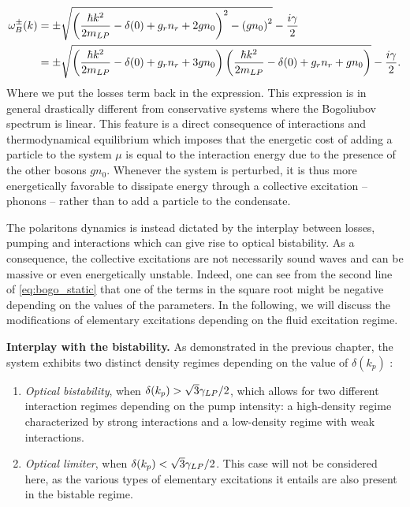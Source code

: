 \begin{equation}
    \begin{aligned}
    \omega^\pm_B(k)&= \pm\sqrt{\left(\dfrac{\hbar k^2}{2m_{LP}}-\delta(0)+ g_rn_r +2g n_0\right)^2 - \left(g n_0\right)^2}-\dfrac{i\gamma}{2} \\
                   &= \pm\sqrt{\left(\dfrac{\hbar k^2}{2m_{LP}}-\delta(0)+ g_rn_r +3g n_0\right)\left(\dfrac{\hbar k^2}{2m_{LP}}-\delta(0)+ g_rn_r +g n_0\right)}-\dfrac{i\gamma}{2}.
    \label{eq:bogo_static}
    \end{aligned}
\end{equation}
Where we put the losses term back in the expression. 
This expression is in general drastically different from conservative systems where the Bogoliubov spectrum is linear. This feature is a direct consequence of 
interactions and thermodynamical equilibrium which imposes that the energetic cost of adding a particle to the system $\mu$ is equal
to the interaction energy due to the presence of the other bosons $gn_0$. Whenever the system is perturbed, it is thus more energetically favorable 
to dissipate energy through a collective excitation -- phonons -- rather than to add a particle to the condensate.

\bigskip

The polaritons dynamics is instead dictated by the interplay between losses, pumping and interactions which can give rise to optical bistability. As a consequence, the 
collective excitations are not necessarily sound waves and can be massive or even energetically unstable. Indeed, one can see from the 
second line of \autoref{eq:bogo_static} that one of the terms in the square root might be negative depending on the values of the parameters. In the following,
we will discuss the modifications of elementary excitations depending on the fluid excitation regime.

\bigskip

\textbf{Interplay with the bistability.} As demonstrated in the previous chapter, the system exhibits two distinct density regimes depending on the value of $\delta(k_p)$ :  

\begin{enumerate}
    \item \textit{Optical bistability}, when $\delta(k_p)>\sqrt{3} \gamma_{LP} / 2$, which allows for two different interaction regimes depending on the pump intensity: a high-density regime characterized by strong interactions and a low-density regime with weak interactions.
    \item \textit{Optical limiter}, when $\delta(k_p)<\sqrt{3} \gamma_{LP} / 2$. This case will not be considered here, as the various types of elementary excitations it entails are also present in the bistable regime.
\end{enumerate} 

